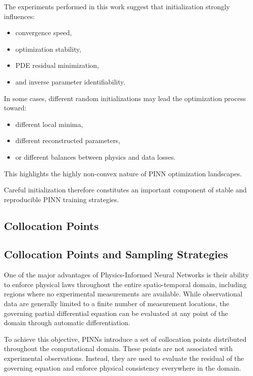 The experiments performed in this work suggest that initialization strongly influences:
\begin{itemize}
    \item convergence speed,
    \item optimization stability,
    \item PDE residual minimization,
    \item and inverse parameter identifiability.
\end{itemize}

In some cases, different random initializations may lead the optimization process toward:
\begin{itemize}
    \item different local minima,
    \item different reconstructed parameters,
    \item or different balances between physics and data losses.
\end{itemize}

This highlights the highly non-convex nature of PINN optimization landscapes.

Careful initialization therefore constitutes an important component of stable and reproducible PINN training strategies.

\subsection{Collocation Points}

\subsection{Collocation Points and Sampling Strategies}

One of the major advantages of Physics-Informed Neural Networks is their ability to enforce physical laws throughout the entire spatio-temporal domain, including regions where no experimental measurements are available. While observational data are generally limited to a finite number of measurement locations, the governing partial differential equation can be evaluated at any point of the domain through automatic differentiation.

To achieve this objective, PINNs introduce a set of collocation points distributed throughout the computational domain. These points are not associated with experimental observations. Instead, they are used to evaluate the residual of the governing equation and enforce physical consistency everywhere in the domain.

